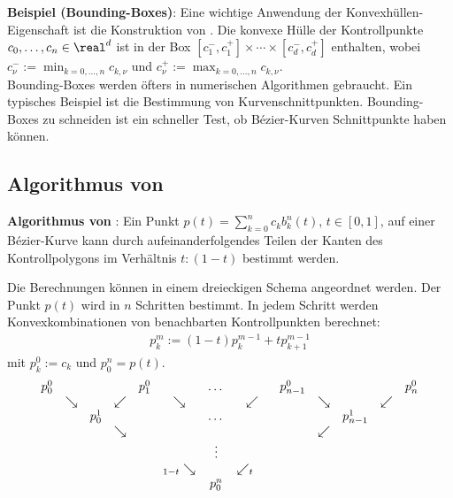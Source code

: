 \linie

\textbf{Beispiel (Bounding-Boxes)}:
Eine wichtige Anwendung der Konvexhüllen-Eigenschaft ist die Konstruktion von
.
Die konvexe Hülle der Kontrollpunkte $c_0, \dotsc, c_n \in \real^d$ ist in der Box
$[c_1^-, c_1^+] \times \dotsb \times [c_d^-, c_d^+]$ enthalten, wobei
$c_\nu^- := \min_{k=0,\dotsc,n} c_{k,\nu}$ und
$c_\nu^+ := \max_{k=0,\dotsc,n} c_{k,\nu}$.\\
Bounding-Boxes werden öfters in numerischen Algorithmen gebraucht.
Ein typisches Beispiel ist die Bestimmung von Kurvenschnittpunkten.
Bounding-Boxes zu schneiden ist ein schneller Test, ob Bézier-Kurven Schnittpunkte haben können.

\pagebreak

\subsection{%
    Algorithmus von %
}

\textbf{Algorithmus von }:
Ein Punkt $p(t) = \sum_{k=0}^n c_k b_k^n(t)$, $t \in [0, 1]$,
auf einer Bézier-Kurve kann durch aufeinanderfolgendes Teilen der Kanten des Kontrollpolygons
im Verhältnis $t : (1 - t)$ bestimmt werden.

Die Berechnungen können in einem dreieckigen Schema angeordnet werden.
Der Punkt $p(t)$ wird in $n$ Schritten bestimmt.
In jedem Schritt werden Konvexkombinationen von benachbarten Kontrollpunkten berechnet:
\begin{align*}
    p_k^m := (1 - t) p_k^{m-1} + t p_{k+1}^{m-1}
\end{align*}
mit $p_k^0 := c_k$ und $p_0^n = p(t)$.
\begin{align*}
    \begin{array}{ccccccccccccc}
        p_0^0 & & & & p_1^0 & & \dots & & p_{n-1}^0 & & & & p_n^0\\
        & \searrow & & \swarrow & & \searrow & & \swarrow & & \searrow & & \swarrow\\
        & & p_0^1 & & & & \dots & & & & p_{n-1}^1\\
        & & & \searrow & & & & & & \swarrow\\
        & & & & & & \vdots & & \\
        & & & & & {}_{1-t}\searrow & & \swarrow_{t\hspace{4mm}}\\
        & & & & & & p_0^n
    \end{array}
\end{align*}

